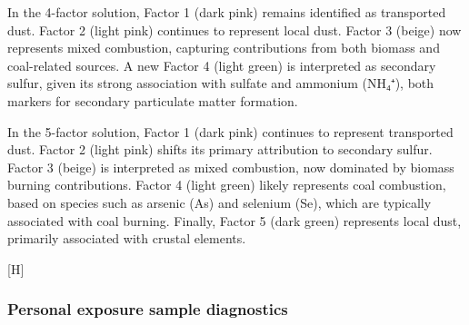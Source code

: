 \documentclass[
  letterpaper,
  DIV=11,
  numbers=noendperiod]{scrartcl}
\makeatletter
\renewenvironment{figure}%
   {\renewcommand\familydefault\sfdefault
    \@float{figure}}
   {\end@float}
\makeatother
\begin{document}
In the 4-factor solution, Factor 1 (dark pink) remains identified as
transported dust. Factor 2 (light pink) continues to represent local
dust. Factor 3 (beige) now represents mixed combustion, capturing
contributions from both biomass and coal-related sources. A new Factor 4
(light green) is interpreted as secondary sulfur, given its strong
association with sulfate and ammonium (NH₄⁺), both markers for secondary
particulate matter formation.

In the 5-factor solution, Factor 1 (dark pink) continues to represent
transported dust. Factor 2 (light pink) shifts its primary attribution
to secondary sulfur. Factor 3 (beige) is interpreted as mixed
combustion, now dominated by biomass burning contributions. Factor 4
(light green) likely represents coal combustion, based on species such
as arsenic (As) and selenium (Se), which are typically associated with
coal burning. Finally, Factor 5 (dark green) represents local dust,
primarily associated with crustal elements.

\begin{figure}[H]

\caption{\label{fig-pmf-sup}3-, 4-, and 5- factor solutions separately
for outdoor and personal exposure samples.}


\end{figure}%

\subsubsection{Personal exposure sample
diagnostics}\label{personal-exposure-sample-diagnostics}
\end{document}
